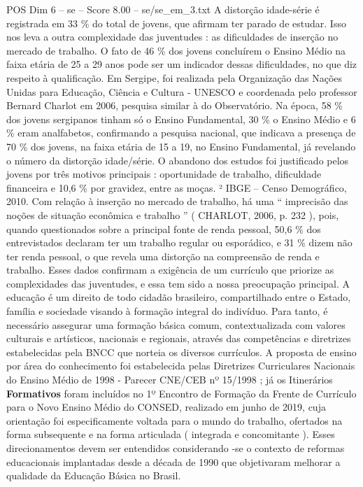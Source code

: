 \begin{textsample}{POS Dim 6 – se – Score 8.00 – se/se\_em\_3.txt}
A distorção idade-série é registrada em 33 \% do total de jovens, que afirmam ter parado de estudar.
Isso nos leva a outra complexidade das juventudes : as dificuldades de inserção no mercado de trabalho.
O fato de 46 \% dos jovens concluírem o Ensino Médio na faixa etária de 25 a 29 anos pode ser um indicador dessas dificuldades, no que diz respeito à qualificação.
Em Sergipe, foi realizada pela Organização das Nações Unidas para Educação, Ciência e Cultura - UNESCO e coordenada pelo professor Bernard Charlot em 2006, pesquisa similar à do Observatório.
Na época, 58 \% dos jovens sergipanos tinham só o Ensino Fundamental, 30 \% o Ensino Médio e 6 \% eram analfabetos, confirmando a pesquisa nacional, que indicava a presença de 70 \% dos jovens, na faixa etária de 15 a 19, no Ensino Fundamental, já revelando o número da distorção idade/série.
O abandono dos estudos foi justificado pelos jovens por três motivos principais : oportunidade de trabalho, dificuldade financeira e 10,6 \% por gravidez, entre as moças. ² IBGE – Censo Demográfico, 2010.
Com relação à inserção no mercado de trabalho, há uma “ imprecisão das noções de situação econômica e trabalho ” ( CHARLOT, 2006, p. 232 ), pois, quando questionados sobre a principal fonte de renda pessoal, 50,6 \% dos entrevistados declaram ter um trabalho regular ou esporádico, e 31 \% dizem não ter renda pessoal, o que revela uma distorção na compreensão de renda e trabalho.
Esses dados confirmam a exigência de um currículo que priorize as complexidades das juventudes, e essa tem sido a nossa preocupação principal.
A educação é um direito de todo cidadão brasileiro, compartilhado entre o Estado, família e sociedade visando à formação integral do indivíduo.
Para tanto, é necessário assegurar uma formação básica comum, contextualizada com valores culturais e artísticos, nacionais e regionais, através das competências e diretrizes estabelecidas pela BNCC que norteia os diversos currículos.
A proposta de ensino por área do conhecimento foi estabelecida pelas Diretrizes Curriculares Nacionais do Ensino Médio de 1998 - Parecer CNE/CEB nº 15/1998 ; já os Itinerários \textbf{Formativos} foram incluídos no 1º Encontro de Formação da Frente de Currículo para o Novo Ensino Médio do CONSED, realizado em junho de 2019, cuja orientação foi especificamente voltada para o mundo do trabalho, ofertados na forma subsequente e na forma articulada ( integrada e concomitante ).
Esses direcionamentos devem ser entendidos considerando -se o contexto de reformas educacionais implantadas desde a década de 1990 que objetivaram melhorar a qualidade da Educação Básica no Brasil.

\end{textsample}
